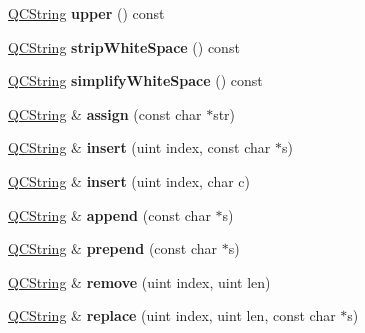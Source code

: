 \begin{DoxyCompactItemize}
\mbox{\hyperlink{class_q_c_string}{Q\+C\+String}} {\bfseries upper} () const
\item 
\mbox{\label{class_q_c_string_a66269a694d9e6961bfd145bb4ca72f42}} 
\mbox{\hyperlink{class_q_c_string}{Q\+C\+String}} {\bfseries strip\+White\+Space} () const
\item 
\mbox{\label{class_q_c_string_a8d6ace0deb439b916b9f97f54a6c9cc2}} 
\mbox{\hyperlink{class_q_c_string}{Q\+C\+String}} {\bfseries simplify\+White\+Space} () const
\item 
\mbox{\label{class_q_c_string_a3d5edf23543be731297cd5dccbf29c22}} 
\mbox{\hyperlink{class_q_c_string}{Q\+C\+String}} \& {\bfseries assign} (const char $\ast$str)
\item 
\mbox{\label{class_q_c_string_af076f8a173eb13ab76516c407150d370}} 
\mbox{\hyperlink{class_q_c_string}{Q\+C\+String}} \& {\bfseries insert} (uint index, const char $\ast$s)
\item 
\mbox{\label{class_q_c_string_aa17bc879a1a58d5403aea176bdab6373}} 
\mbox{\hyperlink{class_q_c_string}{Q\+C\+String}} \& {\bfseries insert} (uint index, char c)
\item 
\mbox{\label{class_q_c_string_a303cf8f6a8f57a92e3bda9423ca643aa}} 
\mbox{\hyperlink{class_q_c_string}{Q\+C\+String}} \& {\bfseries append} (const char $\ast$s)
\item 
\mbox{\label{class_q_c_string_a0a6a8fe99e596b149ee15138fa8dcf0c}} 
\mbox{\hyperlink{class_q_c_string}{Q\+C\+String}} \& {\bfseries prepend} (const char $\ast$s)
\item 
\mbox{\label{class_q_c_string_a20a194da8d31240b28256b6aebd78097}} 
\mbox{\hyperlink{class_q_c_string}{Q\+C\+String}} \& {\bfseries remove} (uint index, uint len)
\item 
\mbox{\label{class_q_c_string_a08cba3c984525d07704bbdfd42ea6267}} 
\mbox{\hyperlink{class_q_c_string}{Q\+C\+String}} \& {\bfseries replace} (uint index, uint len, const char $\ast$s)
\item 

\end{DoxyCompactItemize}
